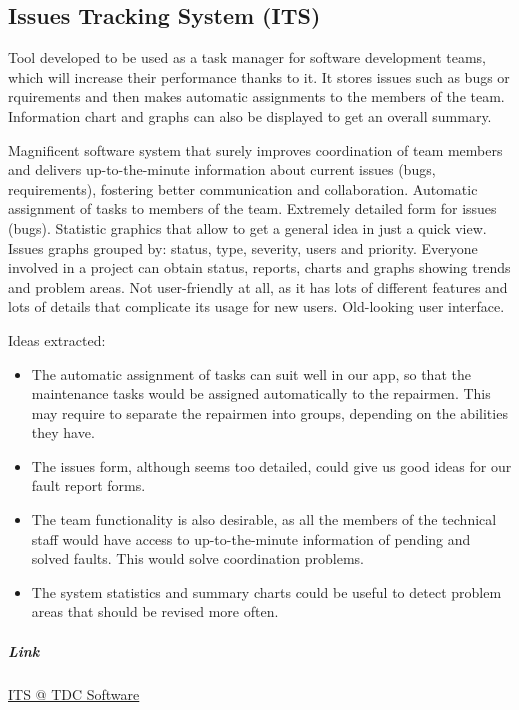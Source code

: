 \subsection{Issues Tracking System (ITS)}

Tool developed to be used as a task manager for software development teams, which will increase their performance thanks to it. It stores issues such as bugs or rquirements and then makes automatic assignments to the members of the team. Information chart and graphs can also be displayed to get an overall summary.

\begin{itemize}
\adv Magnificent software system that surely improves coordination of team members and delivers up-to-the-minute information about current issues (bugs, requirements), fostering better communication and collaboration.
\adv Automatic assignment of tasks to members of the team.
\adv Extremely detailed form for issues (bugs).
\adv Statistic graphics that allow to get a general idea in just a quick view. Issues graphs grouped by: status, type, severity, users and priority.
\adv Everyone involved in a project can obtain status, reports, charts and graphs showing trends and problem areas.
\dsv Not user-friendly at all, as it has lots of different features and lots of details that complicate its usage for new users.
\dsv Old-looking user interface.
\end{itemize}

Ideas extracted:

\begin{itemize}
\item The automatic assignment of tasks can suit well in our app, so that the maintenance tasks would be assigned automatically to the repairmen. This may require to separate the repairmen into groups, depending on the abilities they have.
\item The issues form, although seems too detailed, could give us good ideas for our fault report forms.
\item The team functionality is also desirable, as all the members of the technical staff would have access to up-to-the-minute information of pending and solved faults. This would solve coordination problems.
\item The system statistics and summary charts could be useful to detect problem areas that should be revised more often.
\end{itemize}

\subparagraph{Link}\href{http://www.tdcsoftware.com/?q=en/node/15}{ITS @ TDC Software}


